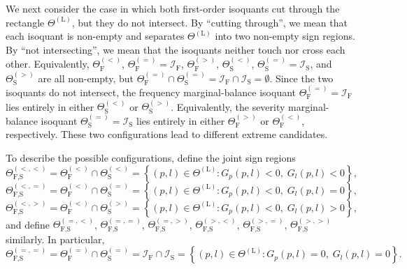 \documentclass[a4paper,12pt]{article}
\begin{document}
We next consider the case in which both first-order isoquants cut through the rectangle $\Theta^{\left(\text{L}\right)}$, but they do not intersect. By ``cutting through'', we mean that each isoquant is non-empty and separates $\Theta^{\left(\text{L}\right)}$ into two non-empty sign regions. By ``not intersecting'', we mean that the isoquants neither touch nor cross each other. Equivalently, $\Theta_{\text{F}}^{\left(<\right)}$, $\Theta_{\text{F}}^{\left(=\right)}=\mathcal{I}_{\text{F}}$, $\Theta_{\text{F}}^{\left(>\right)}$, $\Theta_{\text{S}}^{\left(<\right)}$, $\Theta_{\text{S}}^{\left(=\right)}=\mathcal{I}_{\text{S}}$, and $\Theta_{\text{S}}^{\left(>\right)}$ are all non-empty, but $\Theta_{\text{F}}^{\left(=\right)}\cap\Theta_{\text{S}}^{\left(=\right)}=\mathcal{I}_{\text{F}}\cap\mathcal{I}_{\text{S}}=\emptyset$. Since the two isoquants do not intersect, the frequency marginal-balance isoquant $\Theta_{\text{F}}^{\left(=\right)}=\mathcal{I}_{\text{F}}$ lies entirely in either $\Theta_{\text{S}}^{\left(<\right)}$ or $\Theta_{\text{S}}^{\left(>\right)}$. Equivalently, the severity marginal-balance isoquant $\Theta_{\text{S}}^{\left(=\right)}=\mathcal{I}_{\text{S}}$ lies entirely in either $\Theta_{\text{F}}^{\left(>\right)}$ or $\Theta_{\text{F}}^{\left(<\right)}$, respectively. These two configurations lead to different extreme candidates.

To describe the possible configurations, define the joint sign regions
\begin{equation*}
\Theta_{\text{F,S}}^{\left(<,<\right)}=\Theta_{\text{F}}^{\left(<\right)}\cap\Theta_{\text{S}}^{\left(<\right)}=\left\{\left(p,l\right)\in\Theta^{\left(\text{L}\right)}:G_p\left(p,l\right)<0,\;G_l\left(p,l\right)<0\right\},
\end{equation*}
\begin{equation*}
\Theta_{\text{F,S}}^{\left(<,=\right)}=\Theta_{\text{F}}^{\left(<\right)}\cap\Theta_{\text{S}}^{\left(=\right)}=\left\{\left(p,l\right)\in\Theta^{\left(\text{L}\right)}:G_p\left(p,l\right)<0,\;G_l\left(p,l\right)=0\right\},
\end{equation*}
\begin{equation*}
\Theta_{\text{F,S}}^{\left(<,>\right)}=\Theta_{\text{F}}^{\left(<\right)}\cap\Theta_{\text{S}}^{\left(>\right)}=\left\{\left(p,l\right)\in\Theta^{\left(\text{L}\right)}:G_p\left(p,l\right)<0,\;G_l\left(p,l\right)>0\right\},
\end{equation*}
and define $\Theta_{\text{F,S}}^{\left(=,<\right)}$, $\Theta_{\text{F,S}}^{\left(=,=\right)}$, $\Theta_{\text{F,S}}^{\left(=,>\right)}$, $\Theta_{\text{F,S}}^{\left(>,<\right)}$, $\Theta_{\text{F,S}}^{\left(>,=\right)}$, $\Theta_{\text{F,S}}^{\left(>,>\right)}$ similarly. In particular,
\begin{equation*}
\Theta_{\text{F,S}}^{\left(=,=\right)}=\Theta_{\text{F}}^{\left(=\right)}\cap\Theta_{\text{S}}^{\left(=\right)}=\mathcal{I}_{\text{F}}\cap\mathcal{I}_{\text{S}}=\left\{\left(p,l\right)\in\Theta^{\left(\text{L}\right)}:G_p\left(p,l\right)=0,\;G_l\left(p,l\right)=0\right\}.
\end{equation*}
\end{document}
